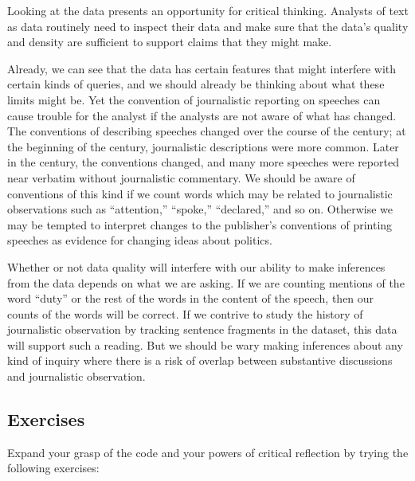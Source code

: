 \documentclass[
]{article}
\begin{document}
Looking at the data presents an opportunity for critical thinking.
Analysts of text as data routinely need to inspect their data and make
sure that the data's quality and density are sufficient to support
claims that they might make.

Already, we can see that the data has certain features that might
interfere with certain kinds of queries, and we should already be
thinking about what these limits might be. Yet the convention of
journalistic reporting on speeches can cause trouble for the analyst if
the analysts are not aware of what has changed. The conventions of
describing speeches changed over the course of the century; at the
beginning of the century, journalistic descriptions were more common.
Later in the century, the conventions changed, and many more speeches
were reported near verbatim without journalistic commentary. We should
be aware of conventions of this kind if we count words which may be
related to journalistic observations such as ``attention,'' ``spoke,''
``declared,'' and so on. Otherwise we may be tempted to interpret
changes to the publisher's conventions of printing speeches as evidence
for changing ideas about politics.

Whether or not data quality will interfere with our ability to make
inferences from the data depends on what we are asking. If we are
counting mentions of the word ``duty'' or the rest of the words in the
content of the speech, then our counts of the words will be correct. If
we contrive to study the history of journalistic observation by tracking
sentence fragments in the dataset, this data will support such a
reading. But we should be wary making inferences about any kind of
inquiry where there is a risk of overlap between substantive discussions
and journalistic observation.

\subsection{Exercises}\label{exercises}

Expand your grasp of the code and your powers of critical reflection by
trying the following exercises:
\end{document}
